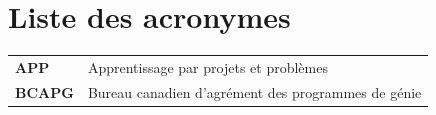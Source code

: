 \documentclass[../main.tex]{subfiles}
\begin{document}

    
\chapter*{Liste des acronymes}
 
\begin{table}[H]
\centering
\begin{tabular}{>{\bfseries}l l}
    APP   & Apprentissage par projets et problèmes \\
    BCAPG & Bureau canadien d'agrément des programmes de génie \\
\end{tabular}
\end{table}
\end{document}
